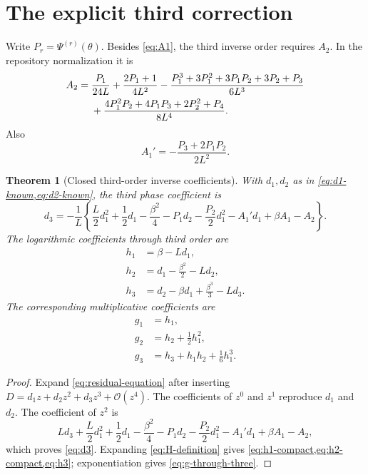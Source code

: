 \documentclass[11pt,oneside]{article}
\numberwithin{equation}{section}
\newtheorem{theorem}{Theorem}[section]
\theoremstyle{definition}
\theoremstyle{remark}
\newcommand{\cO}{\mathcal O}
\begin{document}
\section{The explicit third correction}
\label{sec:third-order}

Write $P_r=\Psi^{(r)}(\theta)$.  Besides \cref{eq:A1}, the third inverse order requires $A_2$.  In the repository normalization it is
\begin{align}
 A_2={}&\frac{P_1}{24L}+\frac{2P_1+1}{4L^2}
 -\frac{P_1^3+3P_1^2+3P_1P_2+3P_2+P_3}{6L^3}
 \notag\\
 &+\frac{4P_1^2P_2+4P_1P_3+2P_2^2+P_4}{8L^4}.
 \label{eq:A2-explicit}
\end{align}
Also
\begin{equation}
 A_1'=-\frac{P_3+2P_1P_2}{2L^2}.
 \label{eq:A1prime}
\end{equation}

\begin{theorem}[Closed third-order inverse coefficients]
\label{thm:third-order}
With $d_1,d_2$ as in \cref{eq:d1-known,eq:d2-known}, the third phase coefficient is
\begin{equation}
 \boxed{
 d_3=-\frac1L\left
 \{\frac L2d_1^2+\frac12d_1-\frac{\beta^2}{4}
 -P_1d_2-\frac{P_2}{2}d_1^2-A_1'd_1
 +\beta A_1-A_2\right\}.}
 \label{eq:d3}
\end{equation}
The logarithmic coefficients through third order are
\begin{align}
 h_1&=\beta-Ld_1,
 \label{eq:h1-compact}\\
 h_2&=d_1-\frac{\beta^2}{2}-Ld_2,
 \label{eq:h2-compact}\\
 h_3&=d_2-\beta d_1+\frac{\beta^3}{3}-Ld_3.
 \label{eq:h3}
\end{align}
The corresponding multiplicative coefficients are
\begin{align}
 g_1&=h_1,\\
 g_2&=h_2+\frac12h_1^2,\\
 g_3&=h_3+h_1h_2+\frac16h_1^3.
 \label{eq:g-through-three}
\end{align}
\end{theorem}

\begin{proof}
Expand \cref{eq:residual-equation} after inserting
$D=d_1z+d_2z^2+d_3z^3+\cO(z^4)$.  The coefficients of $z^0$ and $z^1$ reproduce $d_1$ and $d_2$.  The coefficient of $z^2$ is
\begin{equation}
 Ld_3+\frac L2d_1^2+\frac12d_1-\frac{\beta^2}{4}
 -P_1d_2-\frac{P_2}{2}d_1^2-A_1'd_1+\beta A_1-A_2,
\end{equation}
which proves \cref{eq:d3}.  Expanding \cref{eq:H-definition} gives
\cref{eq:h1-compact,eq:h2-compact,eq:h3}; exponentiation gives
\cref{eq:g-through-three}.
\end{proof}
\end{document}
